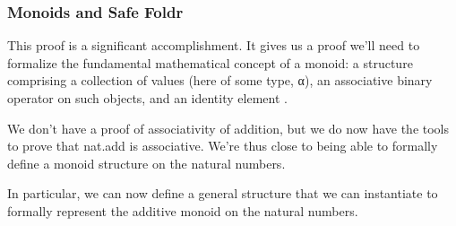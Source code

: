 \documentclass[letterpaper,10pt,english]{sphinxmanual}
\begin{document}
\subsubsection{Monoids and Safe Foldr}
\label{\detokenize{A_03_Recursive_Types:monoids-and-safe-foldr}}
\sphinxAtStartPar
This proof is a significant accomplishment. It gives us a
proof we’ll need to formalize the fundamental mathematical
concept of a monoid: a structure comprising a collection of
values (here of some type, α), an associative binary operator
on such objects, and an identity element .

\sphinxAtStartPar
We don’t have a proof of associativity of addition, but we do
now have the tools to prove that nat.add is associative. We’re
thus close to being able to formally define a monoid structure
on the natural numbers.

\sphinxAtStartPar
In particular, we can now define a general structure that we
can instantiate to formally represent the additive monoid on
the natural numbers.
\end{document}
